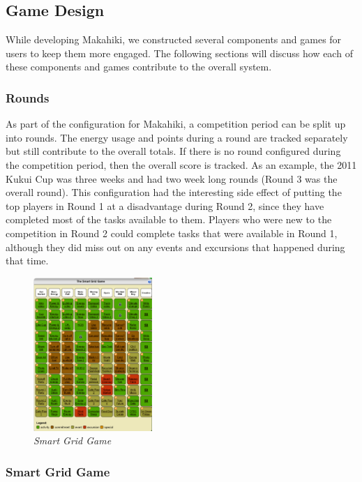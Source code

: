 \documentclass{acm_proc_article-sp}
\begin{document}
\subsection{Game Design}
\label{sys:GameDesign}

While developing Makahiki, we constructed several components and games for users to keep them more engaged. The following sections will discuss how each of these components and games contribute to the overall system.

\subsubsection{Rounds}

As part of the configuration for Makahiki, a competition period can be split up into rounds. The energy usage and points during a round are tracked separately but still contribute to the overall totals. If there is no round configured during the competition period, then the overall score is tracked. As an example, the 2011 Kukui Cup was three weeks and had two week long rounds (Round 3 was the overall round). This configuration had the interesting side effect of putting the top players in Round 1 at a disadvantage during Round 2, since they have completed most of the tasks available to them. Players who were new to the competition in Round 2 could complete tasks that were available in Round 1, although they did miss out on any events and excursions that happened during that time.

\begin{figure}[ht!]
  \center
  \includegraphics[width=0.4\textwidth]{smart-grid.eps}
  \caption{\em \small Smart Grid Game}
  \label{fig:SmartGrid}
\end{figure}

\subsubsection{Smart Grid Game}
\end{document}
